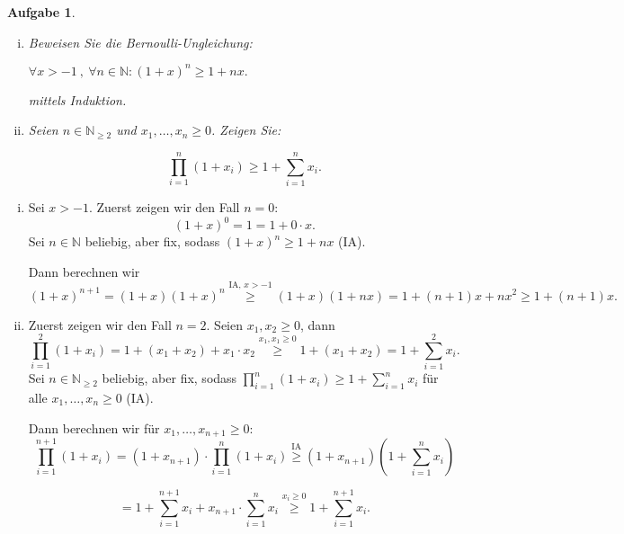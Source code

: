 \documentclass[a4paper, 20]{exam}
\newtheorem{ex}{Aufgabe}
\newcommand\NN{\mathbb{N}}
\begin{document}
\begin{ex} \
\begin{enumerate}[i.)]  
\item
Beweisen Sie die Bernoulli-Ungleichung: 

\begin{center}
$\forall x >-1 \ ,\ \forall n\in \NN: (1+x)^n \geq 1+nx. $
\end{center}

mittels Induktion.

\item
Seien $n\in \NN_{\geq2}$ und $x_1, \dots , x_n \geq 0$. Zeigen Sie:
\begin{center}
$$\prod_{i=1}^n (1+x_i) \geq 1 + \sum_{i=1}^n x_i.$$
\end{center}
\end{enumerate}
\end{ex}
\begin{solution}
\begin{enumerate}[i.)]
\item
Sei $x>-1$.
Zuerst zeigen wir den Fall $n=0$:
$$ (1+x)^0=1 = 1+ 0\cdot x. $$
Sei $n\in \NN$ beliebig, aber fix, sodass 
$(1+x)^{n} \geq 1+nx$ (IA). 

Dann berechnen wir
$$ (1+x)^{n+1} = (1+x)(1+x)^n \stackrel{\text{IA, }  x>-1}{\geq} (1+x)(1+nx)= 1+(n+1)x+nx^2 \geq 1 + (n+1)x.$$ 
\item
Zuerst zeigen wir den Fall $n=2$. Seien $x_1, x_2 \geq 0$, dann
$$ \prod_{i=1}^2 (1+x_i) = 1 + (x_1+x_2) + x_1\cdot x_2 
\stackrel{x_1, x_1 \geq 0}{\geq} 1 + (x_1+x_2) = 1 + \sum_{i=1}^2 x_i.$$
Sei $n\in \NN_{\geq 2}$ beliebig, aber fix, sodass 
$\prod_{i=1}^n (1+x_i) \geq 1 + \sum_{i=1}^n x_i$ f\"ur alle $x_1, \dots, x_n \geq 0$ (IA).

Dann berechnen wir f\"ur $x_1, \dots, x_{n+1} \geq 0$:
$$ \prod_{i=1}^{n+1} (1+x_i) = (1+x_{n+1}) \cdot \prod_{i=1}^{n} (1+x_i)
\stackrel{\text{IA}}{\geq} (1+x_{n+1})(1 + \sum_{i=1}^n x_i)$$

$$= 1 + \sum_{i=1}^{n+1} x_i + x_{n+1}\cdot \sum_{i=1}^n x_i
\stackrel{x_i \geq 0}{\geq} 1 + \sum_{i=1}^{n+1} x_i.$$
\end{enumerate}
\end{solution}
\end{document}

